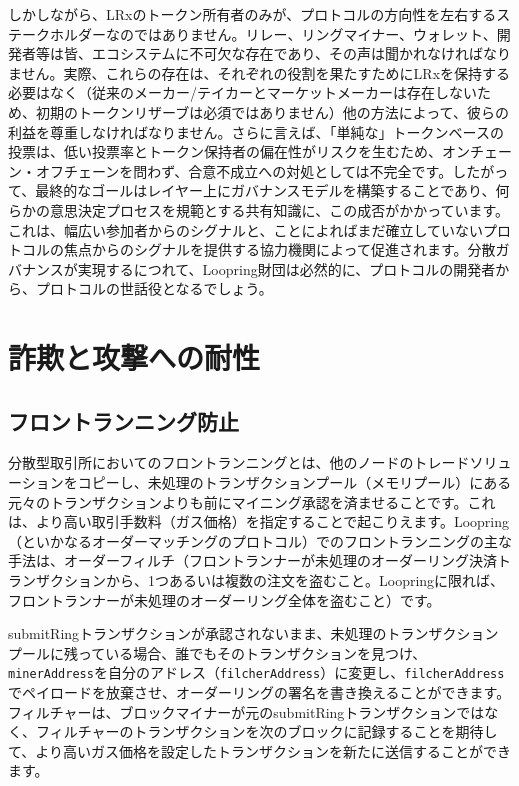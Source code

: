 \documentclass{article}
\begin{document}
\begin{multicols}{2}
しかしながら、LRxのトークン所有者のみが、プロトコルの方向性を左右するステークホルダーなのではありません。リレー、リングマイナー、ウォレット、開発者等は皆、エコシステムに不可欠な存在であり、その声は聞かれなければなりません。実際、これらの存在は、それぞれの役割を果たすためにLRxを保持する必要はなく（従来のメーカー/テイカーとマーケットメーカーは存在しないため、初期のトークンリザーブは必須ではありません）他の方法によって、彼らの利益を尊重しなければなりません。さらに言えば、「単純な」トークンベースの投票は、低い投票率とトークン保持者の偏在性がリスクを生むため、オンチェーン・オフチェーンを問わず、合意不成立への対処としては不完全です。したがって、最終的なゴールはレイヤー上にガバナンスモデルを構築することであり、何らかの意思決定プロセスを規範とする共有知識に、この成否がかかっています。これは、幅広い参加者からのシグナルと、ことによればまだ確立していないプロトコルの焦点からのシグナルを提供する協力機関によって促進されます。分散ガバナンスが実現するにつれて、Loopring財団は必然的に、プロトコルの開発者から、プロトコルの世話役となるでしょう。

\section{詐欺と攻撃への耐性}

\subsection{フロントランニング防止\label{sec:dual_authoring}}

分散型取引所においてのフロントランニングとは、他のノードのトレードソリューションをコピーし、未処理のトランザクションプール（メモリプール）にある元々のトランザクションよりも前にマイニング承認を済ませることです。これは、より高い取引手数料（ガス価格）を指定することで起こりえます。Loopring（といかなるオーダーマッチングのプロトコル）でのフロントランニングの主な手法は、オーダーフィルチ（フロントランナーが未処理のオーダーリング決済トランザクションから、1つあるいは複数の注文を盗むこと。Loopringに限れば、フロントランナーが未処理のオーダーリング全体を盗むこと）です。

submitRingトランザクションが承認されないまま、未処理のトランザクションプールに残っている場合、誰でもそのトランザクションを見つけ、\verb|minerAddress|を自分のアドレス（\verb|filcherAddress|）に変更し、\verb|filcherAddress|でペイロードを放棄させ、オーダーリングの署名を書き換えることができます。フィルチャーは、ブロックマイナーが元のsubmitRingトランザクションではなく、フィルチャーのトランザクションを次のブロックに記録することを期待して、より高いガス価格を設定したトランザクションを新たに送信することができます。


\end{multicols}
\end{document}
